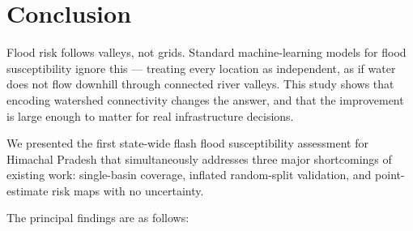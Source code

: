 \section{Conclusion}
\label{sec:conclusion}

Flood risk follows valleys, not grids.
Standard machine-learning models for flood susceptibility ignore this ---
treating every location as independent, as if water does not flow downhill through
connected river valleys.
This study shows that encoding watershed connectivity changes the answer,
and that the improvement is large enough to matter for real infrastructure decisions.

We presented the first state-wide flash flood susceptibility assessment for
Himachal Pradesh that simultaneously addresses three major shortcomings of
existing work: single-basin coverage, inflated random-split validation,
and point-estimate risk maps with no uncertainty.

The principal findings are as follows:

